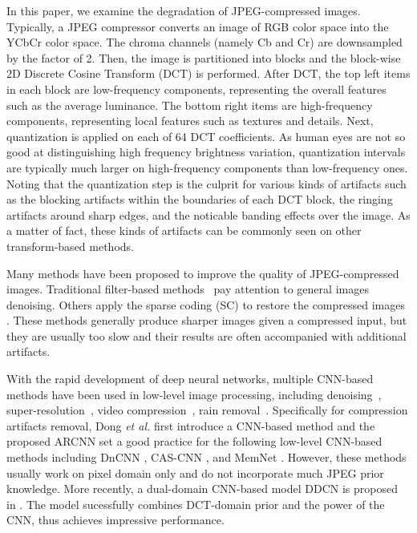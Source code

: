 \documentclass{article}
\begin{document}
In this paper, we examine the degradation of JPEG-compressed images.
Typically, a JPEG compressor converts an image of RGB color space into
the YCbCr color space. The chroma channels (namely Cb and Cr) are downsampled
by the factor of 2. Then, the image is partitioned into  blocks and
the block-wise 2D Discrete Cosine Transform (DCT) is performed. After DCT,
the top left items in each  block are low-frequency components,
representing the overall features such as the average luminance. The bottom right
items are high-frequency components, representing local features such as
textures and details. Next, quantization is applied on each of
64 DCT coefficients. As human eyes are not so good at distinguishing
high frequency brightness variation, quantization intervals are typically
much larger on high-frequency components than low-frequency ones.
Noting that the quantization step is the culprit for various kinds of artifacts
such as the blocking artifacts within the boundaries of each 
DCT block, the ringing artifacts around sharp edges, and the noticable
banding effects over the image. As a matter of fact, these kinds of artifacts
can be commonly seen on other transform-based methods.

Many methods have been proposed to improve the quality of JPEG-compressed
images. Traditional filter-based methods~\cite{foi2007pointwise,dabov2007image}
pay attention to general images denoising. Others apply the sparse coding (SC)
to restore the compressed images \cite{chang2014reducing,liu2015data}.
These methods generally produce sharper images given a compressed input,
but they are usually too slow and their results are often accompanied
with additional artifacts.

With the rapid development of deep neural networks, multiple CNN-based methods
have been used in low-level image processing,
including denoising~\cite{zhang2017beyond,zhang2018dynamically},
super-resolution~\cite{Dong2016SRCNN,Yang2018MALDEC,YANG201879},
video compression~\cite{yueyu_2018_DCC,Sifeng_2018_DCC},
rain removal~\cite{Fu_2017_CVPR,Qian_2018_CVPR,Jiaying_2018_CVPR}.
Specifically for compression artifacts removal, Dong \textit{et al.}
\cite{dong2015compression} first introduce a CNN-based method and
the proposed ARCNN set a good practice for the following low-level CNN-based
methods including DnCNN \cite{zhang2017beyond}, CAS-CNN \cite{cavigelli2017cas},
and MemNet \cite{tai2017memnet}.
However, these methods usually work on pixel domain only and do not
incorporate much JPEG prior knowledge. More recently, a dual-domain
CNN-based model DDCN is proposed in  \cite{guo2016building}.
The model sucessfully combines DCT-domain prior and the power of
the CNN, thus achieves impressive performance.
\end{document}
